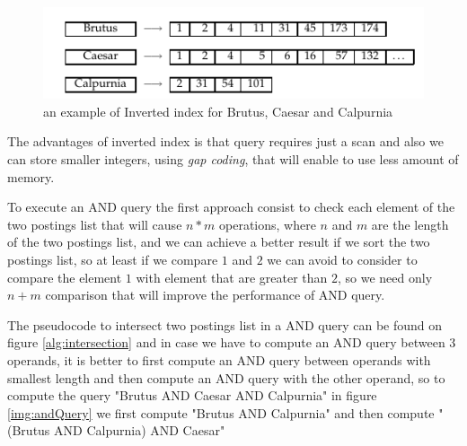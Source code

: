 \begin{figure}
    \includegraphics[width=\textwidth]{Images/invertedIndex}
    \caption{an example of Inverted index for Brutus, Caesar and Calpurnia}
    \label{img:invertedIndex}
\end{figure}
The advantages of inverted index is that query requires just a scan and also we can store smaller integers,
using \emph{gap coding}, that will enable to use less amount of memory.

To execute an AND query the first approach consist to check each element of the two postings list that will cause 
$n * m$ operations, where $n$ and $m$ are the length of the two postings list, and we can achieve a better result
if we sort the two postings list, so at least if we compare $1$ and $2$ we can avoid to consider to compare the
element $1$ with element that are greater than $2$, so we need only $n + m$ comparison that will improve the
performance of AND query.


The pseudocode to intersect two postings list in a AND query can be found on figure \ref{alg:intersection} and
in case we have to compute an AND query between 3 operands, it is better to first compute an AND query between
operands with smallest length and then compute an AND query with the other operand, so to compute the 
query "Brutus AND Caesar AND Calpurnia" in figure \ref{img:andQuery} we first compute "Brutus AND Calpurnia" and
then compute "(Brutus AND Calpurnia) AND Caesar"

